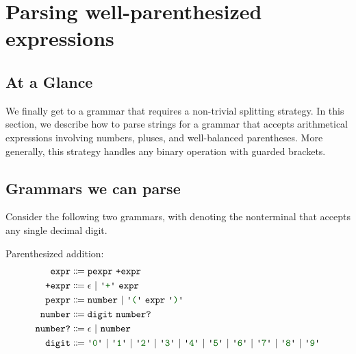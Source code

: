 \newcommand{\nullentry}{\texttt{\ensuremath{\emptyset}}}

\chapter{Parsing well-parenthesized expressions}\label{ch:tables}
%  
\section{At a Glance}
  We finally get to a grammar that requires a non-trivial splitting strategy.  In this section, we describe how to parse strings for a grammar that accepts arithmetical expressions involving numbers, pluses, and well-balanced parentheses.  More generally, this strategy handles any binary operation with guarded brackets.
  
\section{Grammars we can parse}
  Consider the following two grammars, with  denoting the nonterminal that accepts any single decimal digit.
  
  Parenthesized addition:
  \begin{align*}
    \nt{expr} & \Coloneqq \nt{pexpr}~\nt{+expr} \\
    \nt{+expr} & \Coloneqq \epsilon~|~\terminal{+}~\nt{expr} \\
    \nt{pexpr} & \Coloneqq \nt{number}~|~\terminal{(}~\nt{expr}~\terminal{)} \\
    \nt{number} & \Coloneqq \nt{digit}~\nt{number?} \\
    \nt{number?} & \Coloneqq \epsilon~|~\nt{number} \\
    \nt{digit} & \Coloneqq \terminal{0}~|~\terminal{1}~|~\terminal{2}~|~\terminal{3}~|~\terminal{4}~|~\terminal{5}~|~\terminal{6}~|~\terminal{7}~|~\terminal{8}~|~\terminal{9}
  \end{align*}
  
